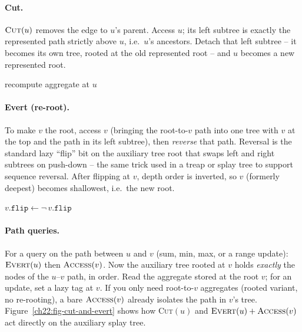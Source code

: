 \paragraph{Cut.}
$\textsc{Cut}(u)$ removes the edge to $u$'s parent. Access $u$; its left subtree
is exactly the represented path strictly above $u$, i.e.\ $u$'s ancestors. Detach
that left subtree -- it becomes its own tree, rooted at the old represented root
-- and $u$ becomes a new represented root.

\begin{algorithm}[H]
\caption{$\textsc{Cut}(u)$ -- detach $u$ from its parent}
\label{ch22:alg-cut}
\DontPrintSemicolon
{}
\;
recompute aggregate at $u$\;
\end{algorithm}

\paragraph{Evert (re-root).}
To make $v$ the root, access $v$ (bringing the root-to-$v$ path into one tree with
$v$ at the top and the path in its left subtree), then \emph{reverse} that path.
Reversal is the standard lazy ``flip'' bit on the auxiliary tree root that swaps
left and right subtrees on push-down -- the same trick used in a treap or splay
tree to support sequence reversal. After flipping at $v$, depth order is inverted,
so $v$ (formerly deepest) becomes shallowest, i.e.\ the new root.

\begin{algorithm}[H]
\caption{$\textsc{Evert}(v)$ -- make $v$ the root of its tree}
\label{ch22:alg-evert}
\DontPrintSemicolon
{}
\;
$v.\texttt{flip} \leftarrow \lnot\, v.\texttt{flip}$ 
\end{algorithm}

\paragraph{Path queries.}
For a query on the path between $u$ and $v$ (sum, min, max, or a range update):
$\textsc{Evert}(u)$ then $\textsc{Access}(v)$. Now the auxiliary tree rooted at
$v$ holds \emph{exactly} the nodes of the $u$--$v$ path, in order. Read the
aggregate stored at the root $v$; for an update, set a lazy tag at $v$. If you
only need root-to-$v$ aggregates (rooted variant, no re-rooting), a bare
$\textsc{Access}(v)$ already isolates the path in $v$'s tree.
Figure~\ref{ch22:fig-cut-and-evert} shows how \textsc{Cut}$(u)$ and
$\textsc{Evert}(u)+\textsc{Access}(v)$ act directly on the auxiliary splay tree.

